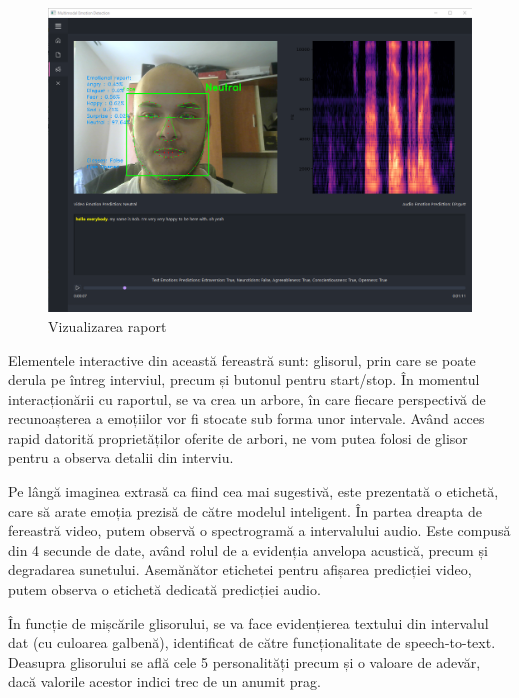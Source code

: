\documentclass[a4paper, 12pt]{report}
\begin{document}
	\begin{figure}[H]
		\begin{center}
			\includegraphics[scale=0.35]{images/emotion_report_visualize.png}
		\end{center}
		\caption{Vizualizarea raport}
		\label{fig:emotion_report}
	\end{figure}
	
	Elementele interactive din această fereastră sunt: glisorul, prin care se poate derula pe întreg interviul, precum și butonul pentru start/stop. În momentul interacționării cu raportul, se va crea un arbore, în care fiecare perspectivă de recunoașterea a emoțiilor vor fi stocate sub forma unor intervale. Având acces rapid datorită proprietăților oferite de arbori, ne vom putea folosi de glisor pentru a observa detalii din interviu.
	
	Pe lângă imaginea extrasă ca fiind cea mai sugestivă, este prezentată o etichetă, care să arate emoția prezisă de către modelul inteligent. În partea dreapta de fereastră video, putem observă o spectrogramă a intervalului audio. Este compusă din 4 secunde de date, având rolul de a evidenția anvelopa acustică, precum și degradarea sunetului. Asemănător etichetei pentru afișarea predicției video, putem observa o etichetă dedicată predicției audio.
	
	În funcție de mișcările glisorului, se va face evidențierea textului din intervalul dat (cu culoarea galbenă), identificat de către funcționalitate de speech-to-text. Deasupra glisorului se află cele 5 personalități precum și o valoare de adevăr, dacă valorile acestor indici trec de un anumit prag.
	
\end{document}

